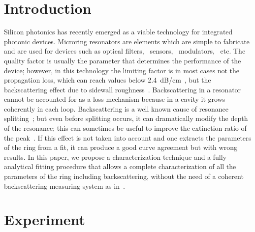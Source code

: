 \section{Introduction}

Silicon photonics has recently emerged as a viable technology for integrated photonic devices. Microring resonators are elements which are simple to fabricate and are used for devices such as optical filters,~\cite{Little1998} sensors,~\cite{DeVos2007} modulators,~\cite{So2004} etc. The quality factor is usually the parameter that determines the performance of the device; however, in this technology the limiting factor is in most cases not the propagation loss, which can reach values below 2.4~dB/cm~\cite{Dumon2004}, but the backscattering effect due to sidewall roughness~\cite{Morichetti2010a}. Backscattering in a resonator cannot be accounted for as a loss mechanism because in a cavity it grows coherently in each loop. Backscattering is a well known cause of resonance splitting~\cite{Little1997a,Kippenberg2002}; but even before splitting occurs, it can dramatically modify the depth of the resonance; this can sometimes be useful to improve the extinction ratio of the peak~\cite{Zhang2008}. If this effect is not taken into account and one extracts the parameters of the ring from a fit, it can produce a good curve agreement but with wrong results.  In this paper, we propose a characterization technique and a fully analytical fitting procedure that allows a complete characterization of all the parameters of the ring including backscattering, without the need of a coherent backscattering measuring system as in~\cite{Morichetti2010a,Morichetti2010b}.

\section{Experiment}

